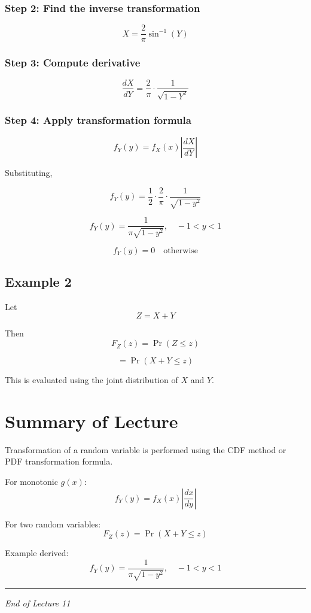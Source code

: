 \documentclass[11pt]{article}
\begin{document}
\subsubsection*{Step 2: Find the inverse transformation}

\[
X = \frac{2}{\pi} \sin^{-1}(Y)
\]

\subsubsection*{Step 3: Compute derivative}

\[
\frac{dX}{dY} = \frac{2}{\pi} \cdot \frac{1}{\sqrt{1 - Y^2}}
\]

\subsubsection*{Step 4: Apply transformation formula}

\[
f_Y(y) = f_X(x) \left| \frac{dX}{dY} \right|
\]

Substituting,

\[
f_Y(y) =
\frac{1}{2}
\cdot
\frac{2}{\pi}
\cdot
\frac{1}{\sqrt{1-y^2}}
\]

\[
f_Y(y) =
\frac{1}{\pi \sqrt{1-y^2}},
\quad -1 < y < 1
\]

\[
f_Y(y) = 0 \quad \text{otherwise}
\]

\subsection{Example 2}

Let
\[
Z = X + Y
\]

Then
\[
F_Z(z) = \Pr(Z \le z)
\]

\[
= \Pr(X + Y \le z)
\]

This is evaluated using the joint distribution of $X$ and $Y$.

\section{Summary of Lecture}

Transformation of a random variable is performed using the CDF method or PDF transformation formula.

For monotonic $g(x)$:
\[
f_Y(y) = f_X(x) \left| \frac{dx}{dy} \right|
\]

For two random variables:
\[
F_Z(z) = \Pr(X + Y \le z)
\]

Example derived:
\[
f_Y(y) =
\frac{1}{\pi \sqrt{1-y^2}},
\quad -1 < y < 1
\]

\bigskip
\hrule
\vspace{0.2cm}
\begin{center}
    \small \textit{End of Lecture 11}
\end{center}
\end{document}
